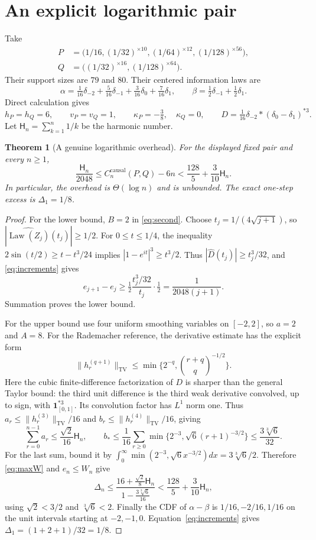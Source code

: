 \documentclass[11pt,a4paper]{article}
\newtheorem{theorem}{Theorem}
\numberwithin{equation}{section}
\newcommand{\Law}{\operatorname{Law}}
\newcommand{\TV}{\mathrm{TV}}
\begin{document}
\section{An explicit logarithmic pair}\label{sec:explicit}
Take
\begin{align*}
P&=\bigl(1/16,(1/32)^{\times10},(1/64)^{\times12},
                       (1/128)^{\times56}\bigr),\\
Q&=\bigl((1/32)^{\times16},(1/128)^{\times64}\bigr).
\end{align*}
Their support sizes are $79$ and $80$. Their centered information laws are
\[
\alpha=\tfrac1{16}\delta_{-2}+\tfrac5{16}\delta_{-1}
       +\tfrac3{16}\delta_0+\tfrac7{16}\delta_1,
\qquad \beta=\tfrac12\delta_{-1}+\tfrac12\delta_1.
\]
Direct calculation gives
\[
h_P=h_Q=6,\qquad v_P=v_Q=1,\qquad
\kappa_P=-\tfrac38,\quad\kappa_Q=0,\qquad
D=\tfrac1{16}\delta_{-2}*(\delta_0-\delta_1)^{*3}.
\]
Let $\mathsf H_n=\sum_{k=1}^n1/k$ be the harmonic number.

\begin{theorem}[A genuine logarithmic overhead]\label{thm:explicit}
For the displayed fixed pair and every $n\ge1$,
\begin{equation}\label{eq:explicit}
\boxed{\frac{\mathsf H_n}{2048}
\le C_n^{\mathrm{causal}}(P,Q)-6n
<\frac{128}{5}+\frac3{10}\mathsf H_n.}
\end{equation}
In particular, the overhead is $\Theta(\log n)$ and is unbounded.
The exact one-step excess is $\Delta_1=1/8$.
\end{theorem}
\begin{proof}
For the lower bound, $B=2$ in \eqref{eq:second}. Choose
$t_j=1/(4\sqrt{j+1})$, so $|\widehat{\Law(Z_j)}(t_j)|\ge1/2$.
For $0\le t\le1/4$, the inequality
$2\sin(t/2)\ge t-t^3/24$ implies
$|1-e^{it}|^3\ge t^3/2$. Thus
$|\widehat D(t_j)|\ge t_j^3/32$, and
\eqref{eq:increments} gives
\[
e_{j+1}-e_j\ge\tfrac12\frac{t_j^3/32}{t_j}\cdot\tfrac12
=\frac1{2048(j+1)}.
\]
Summation proves the lower bound.

For the upper bound use four uniform smoothing variables on $[-2,2]$,
so $a=2$ and $A=8$. For the Rademacher reference, the derivative estimate
has the explicit form
\[
\|h_r^{(q+1)}\|_{\TV}
\le\min\{2^{-q},\binom{r+q}{q}^{-1/2}\}.
\]
Here the cubic finite-difference factorization of $D$ is sharper than
the general Taylor bound: the third unit difference is the third weak
derivative convolved, up to sign, with $\mathbf1_{[0,1]}^{*3}$.
Its convolution factor has $L^1$ norm one. Thus
$a_r\le\|h_r^{(3)}\|_{\TV}/16$ and
$b_r\le\|h_r^{(4)}\|_{\TV}/16$, giving
\[
\sum_{r=0}^{n-1}a_r\le\frac{\sqrt2}{16}\mathsf H_n,
\qquad
b_*\le\frac1{16}\sum_{r\ge0}
\min\{2^{-3},\sqrt6(r+1)^{-3/2}\}
\le\frac{3\sqrt[3]6}{32}.
\]
For the last sum, bound it by
$\int_0^\infty\min(2^{-3},\sqrt6 x^{-3/2})dx
=3\sqrt[3]6/2$.
Therefore \eqref{eq:maxW} and $e_n\le W_n$ give
\[
\Delta_n\le
\frac{16+\frac{\sqrt2}{8}\mathsf H_n}
     {1-\frac{3\sqrt[3]6}{16}}
<\frac{128}{5}+\frac3{10}\mathsf H_n,
\]
using $\sqrt2<3/2$ and $\sqrt[3]6<2$.
Finally the CDF of $\alpha-\beta$ is $1/16,-2/16,1/16$ on the unit
intervals starting at $-2,-1,0$. Equation~\eqref{eq:increments} gives
$\Delta_1=(1+2+1)/32=1/8$.
\end{proof}
\end{document}

